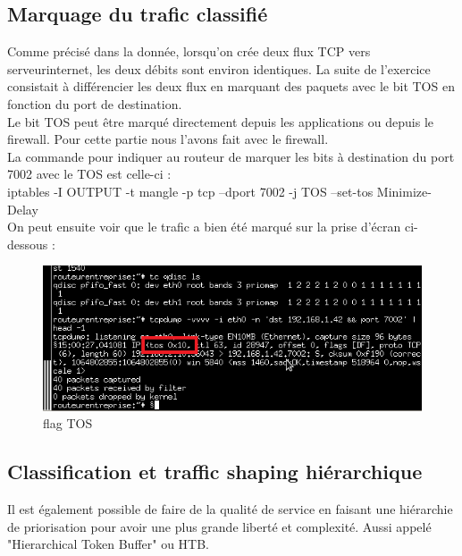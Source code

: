 \documentclass{article}
\begin{document}
\subsection{Marquage du trafic classifié}

Comme précisé dans la donnée, lorsqu'on crée deux flux TCP vers serveurinternet, les deux débits sont environ identiques. La suite de l'exercice consistait à différencier les deux flux en marquant des paquets avec le bit TOS en fonction du port de destination.\\

Le bit TOS peut être marqué directement depuis les applications ou depuis le firewall. Pour cette partie nous l'avons fait avec le firewall.\\

La commande pour indiquer au routeur de marquer les bits à destination du port 7002 avec le TOS est celle-ci :\\

iptables -I OUTPUT -t mangle -p tcp --dport 7002 -j TOS --set-tos Minimize-Delay\\

On peut ensuite voir que le trafic a bien été marqué sur la prise d'écran ci-dessous : 

\begin{figure}[h]
  \centering
  \includegraphics[width=\linewidth]{./captures/tos-Flag.png}
  \caption{flag TOS}
  \label{fig:token-bucket}
\end{figure}


\subsection{Classification et traffic shaping hiérarchique}

Il est également possible de faire de la qualité de service en faisant une hiérarchie de priorisation pour avoir une plus grande liberté et complexité. Aussi appelé "Hierarchical Token Buffer" ou HTB. \\
\end{document}
